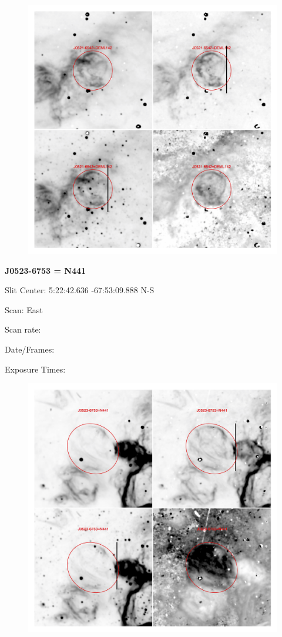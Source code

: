 \documentclass[11pt]{article}
\begin{document}
\begin{figure}
\includegraphics[width=11.cm]{snapshots/J0521-6542.png}
\end{figure}

\newpage
{\bf J0523-6753 = N441}  
 
Slit Center:   5:22:42.636  -67:53:09.888 N-S

Scan:  East

Scan rate:  

Date/Frames:

Exposure Times:  

\begin{figure}
\includegraphics[width=11.cm]{snapshots/J0523-6753.png}
\end{figure}
\end{document}
